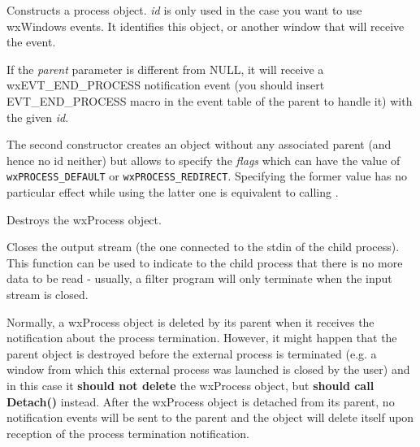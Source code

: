 
Constructs a process object. {\it id} is only used in the case you want to
use wxWindows events. It identifies this object, or another window that will
receive the event.

If the {\it parent} parameter is different from NULL, it will receive
a wxEVT\_END\_PROCESS notification event (you should insert EVT\_END\_PROCESS
macro in the event table of the parent to handle it) with the given {\it id}.

The second constructor creates an object without any associated parent (and
hence no id neither) but allows to specify the {\it flags} which can have the
value of {\tt wxPROCESS\_DEFAULT} or {\tt wxPROCESS\_REDIRECT}. Specifying the
former value has no particular effect while using the latter one is equivalent
to calling .







Destroys the wxProcess object.

\label{wxprocesscloseoutput}


Closes the output stream (the one connected to the stdin of the child
process). This function can be used to indicate to the child process that
there is no more data to be read - usually, a filter program will only
terminate when the input stream is closed.

\label{wxprocessdetach}


Normally, a wxProcess object is deleted by its parent when it receives the
notification about the process termination. However, it might happen that the
parent object is destroyed before the external process is terminated (e.g. a
window from which this external process was launched is closed by the user)
and in this case it {\bf should not delete} the wxProcess object, but
{\bf should call Detach()} instead. After the wxProcess object is detached
from its parent, no notification events will be sent to the parent and the
object will delete itself upon reception of the process termination
notification.

